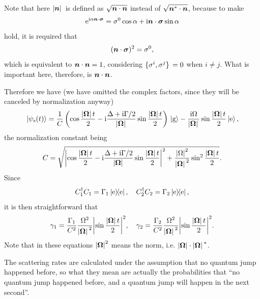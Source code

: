 \documentclass[hyperref, a4paper]{article}
\newcommand*{\ii}{\mathrm{i}}
\newcommand*{\ee}{\mathrm{e}}
\begin{document}
\begin{itemize}
\begin{equation}
\end{equation}
\begin{note*}{}{}
    Note that here $\abs*{\vb*{n}}$ is defined as $\sqrt{\vb*{n} \cdot \vb*{n}}$ instead of 
    $\sqrt{\vb*{n}^* \cdot \vb*{n}}$, because to make 
    \[
        \ee^{\ii \alpha \vb*{n} \cdot \vb*{\sigma}} = \sigma^0 \cos \alpha + \ii \vb*{n} \cdot \vb*{\sigma} \sin \alpha
    \]
    hold, it is required that 
    \[
        (\vb*{n} \cdot \vb*{\sigma})^2 = \sigma^0,
    \]
    which is equivalent to $\vb*{n} \cdot \vb*{n} = 1$, considering $\acomm*{\sigma^i}{\sigma^j} = 0$ 
    when $i \neq j$. What is important here, therefore, is $\vb*{n} \cdot \vb*{n}$.
\end{note*}
Therefore we have (we have omitted the complex factors, since they will be canceled by normalization anyway) 
\begin{equation}
    \ket*{\psi_\text{s}(t)} = \frac{1}{C} \left( \cos \frac{\abs*{\vb*{\Omega}} t}{2} - \ii \frac{\Delta + \ii \Gamma / 2}{\abs*{\vb*{\Omega}}} \sin \frac{\abs*{\vb*{\Omega}} t}{2}  \right) \ket*{\text{g}} - \frac{\ii \Omega}{\abs*{\vb*{\Omega}}} \sin \frac{\abs*{\vb*{\Omega}} t}{2} \ket*{\text{e}},
\end{equation}
the normalization constant being 
\begin{equation}
    C = \sqrt{ \abs{\cos \frac{\abs*{\vb*{\Omega}} t}{2} - \ii \frac{\Delta + \ii \Gamma / 2}{\abs*{\vb*{\Omega}}} \sin \frac{\abs*{\vb*{\Omega}} t}{2} }^2 + \frac{\abs{\Omega}^2}{\abs*{\vb*{\Omega}}^2} \sin^2 \frac{\abs*{\vb*{\Omega}} t}{2} }.
\end{equation}
Since  
\[
    C_1^\dagger C_1 = \Gamma_1 \dyad{\text{e}}, \quad C_2^\dagger C_2 = \Gamma_2 \dyad{\text{e}},
\]
it is then straightforward that 
\begin{equation}
    \gamma_1 = \frac{\Gamma_1}{{C}^2} \frac{\Omega^2}{\abs*{\vb*{\Omega}}^2} \abs{\sin \frac{\abs*{\vb*{\Omega}} t}{2}}^2,
    \quad \gamma_2 = \frac{\Gamma_2}{{C}^2} \frac{\Omega^2}{\abs*{\vb*{\Omega}}^2} \abs{\sin \frac{\abs*{\vb*{\Omega}} t}{2}}^2.
\end{equation}
Note that in these equations $\abs{\vb*{\Omega}}^2$ means the norm, i.e. $\abs{\vb*{\Omega}} \cdot \abs*{\vb*{\Omega}}^*$. 

The scattering rates are calculated under the assumption that no quantum jump happened before, so what they mean
are actually the probabilities that ``no quantum jump happened before, and a quantum jump will happen in the next 
second''.


\end{itemize}
\end{document}
